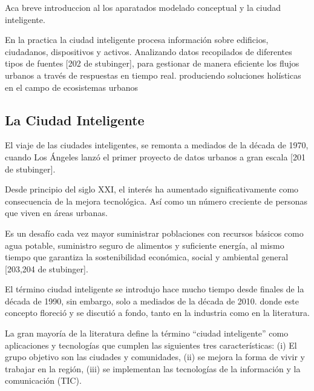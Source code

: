 \documentclass[a4paper,fleqn,spanish]{cas-dc}
\begin{document}
Aca breve introduccion al los aparatados 
modelado conceptual y la ciudad inteligente.

En la practica
la ciudad inteligente
procesa información sobre edificios, ciudadanos,
dispositivos y activos. 
Analizando datos
recopilados de diferentes tipos de
fuentes [202 de stubinger], 
para gestionar de manera eficiente los flujos urbanos
a través de respuestas en tiempo real.
produciendo
soluciones holísticas en el campo de ecosistemas urbanos



\subsection{La Ciudad Inteligente}\label{concepto}


El viaje de las ciudades inteligentes, se remonta a
mediados de la década de 1970, cuando Los Ángeles lanzó el primer proyecto de
datos urbanos a gran escala [201 de stubinger].

Desde principio del siglo XXI, el interés ha aumentado significativamente
como consecuencia de la mejora tecnológica. Así como un número creciente de
personas que viven en áreas urbanas.

Es un desafío cada vez mayor suministrar
poblaciones con recursos básicos como agua potable, suministro seguro de
alimentos y suficiente energía, al mismo tiempo que garantiza la sostenibilidad
económica, social y ambiental general [203,204 de stubinger].

El término ciudad inteligente se introdujo hace mucho tiempo desde finales de
la década de 1990, sin embargo, solo a mediados de la década de 2010.
donde este concepto floreció y se discutió a fondo, tanto en la industria como en la
literatura.

La gran mayoría de la literatura define la término “ciudad inteligente” como
aplicaciones y tecnologías que cumplen las siguientes tres características:
(i) El grupo objetivo son las ciudades y comunidades,
(ii) se mejora la forma de vivir y trabajar en la región,
(iii) se implementan las tecnologías de la información y la comunicación (TIC).
\end{document}
